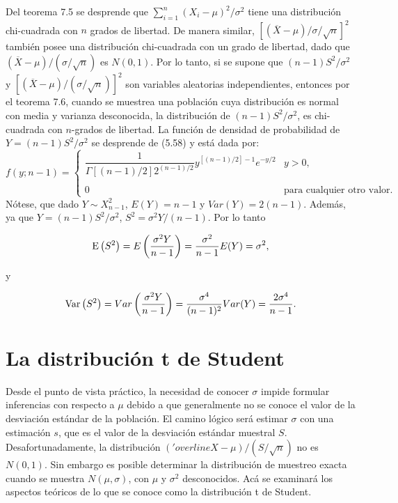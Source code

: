 Del teorema 7.5 se desprende que $\sum_{i=1}^n (X_i-\mu)^2/\sigma^2$ tiene una distribución chi-cuadrada con $n$ grados de libertad. De manera similar, $\left[(\overline{X}-\mu)/\sigma/\sqrt{n}\right]^2$ también posee una distribución chi-cuadrada con un grado de libertad, dado que $(\overline{X}-\mu)/(\sigma/\sqrt{n})$ es $N(0,1)$. Por lo tanto, si se supone que $(n-1)S^2/\sigma^2$ y $\left[(\overline{X}-\mu)/(\sigma/\sqrt{n})\right]^2$ son variables aleatorias independientes, entonces por el teorema 7.6, cuando se muestrea una población cuya distribución es normal con media y varianza desconocida, la distribución de $(n-1)S^2/\sigma^2$, es chi-cuadrada con $n$-grados de libertad. La función de densidad de probabilidad de $Y=(n-1)S^2/\sigma^2$ se desprende de (5.58) y está dada por:
$$
f(y;n-1)=
\left\{
    \begin{array}{lc}
	\dfrac{1}{\Gamma\left[(n-1)/2\right]2^{(n-1)/2}}y^{\left[(n-1)/2\right]-1}e^{-y/2} & y>0,\\\\
	0&\mbox{para cualquier otro valor.}
    \end{array}
\right.
$$
Nótese, que dado $Y\sim X_{n-1}^2$, $E(Y)=n-1$ y $Var(Y)=2(n-1)$. Además, ya que $Y=(n-1)S^2/\sigma^2$, $S^2=\sigma^2Y/(n-1)$. Por lo tanto
\begin{tcolorbox}
    $$\mathop{\mbox{\normalfont E}}\nolimits\left(S^2\right)=E\left(\dfrac{\sigma^2 Y}{n-1}\right)=\dfrac{\sigma^2}{n-1}E(Y)=\sigma^2,$$
\end{tcolorbox}

y 

\begin{tcolorbox}
    $$\mathop{\mbox{\normalfont Var}}\nolimits\left(S^2\right)=Var\left(\dfrac{\sigma^2Y}{n-1}\right)=\dfrac{\sigma^4}{(n-1)^2}Var(Y)=\dfrac{2\sigma^4}{n-1}.$$
\end{tcolorbox}


\section{La distribución t de Student}

Desde el punto de vista práctico, la necesidad de conocer $\sigma$ impide formular inferencias con respecto a $\mu$ debido a que generalmente no se conoce el valor de la desviación estándar de la población. El camino lógico será estimar $\sigma$ con una estimación $s$, que es el valor de la desviación estándar muestral $S$. Desafortunadamente, la distribución $('overline{X}-\mu)/(S/\sqrt{n})$ no es $N(0,1)$. Sin embargo es posible determinar la distribución de muestreo exacta cuando se muestra $N(\mu,\sigma)$, con $\mu$ y $\sigma^2$ desconocidos. Acá se examinará los aspectos teóricos de lo que se conoce como la distribución t de Student.
